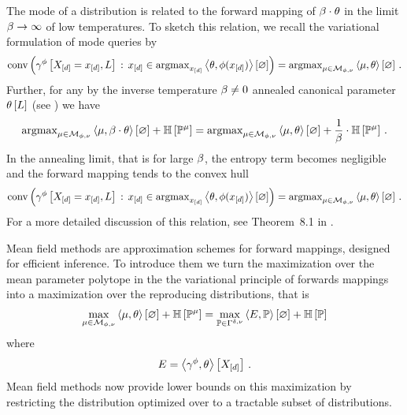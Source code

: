 The mode of a distribution is related to the forward mapping of $\beta\cdot\theta$ in the limit $\beta\rightarrow\infty$ of low temperatures.
To sketch this relation, we recall the variational formulation of mode queries by
\begin{align*}
    \mathrm{conv}\left(\gamma^{\phi}\left[X_{[d]}=x_{[d]},L\right] \, : \, x_{[d]}\in\mathrm{argmax}_{x_{[d]}}\left\langle \theta,\phi(x_{[d]})\right\rangle \left[ \varnothing \right]\right)
    = \mathrm{argmax}_{\mu\in\mathcal{M}_{\phi,\nu}} \left\langle \mu,\theta\right\rangle \left[ \varnothing \right]  \, .
\end{align*}
Further, for any by the inverse temperature $\beta\neq0$ annealed canonical parameter $\theta\left[L\right]$ (see ) we have
\begin{align*}
    \mathrm{argmax}_{\mu\in\mathcal{M}_{\phi,\nu}}  \left\langle \mu,\beta\cdot\theta\right\rangle \left[ \varnothing \right]+ \mathbb{H}\left[\mathbb{P}^{\mu}\right]
    = \mathrm{argmax}_{\mu\in\mathcal{M}_{\phi,\nu}}  \left\langle \mu,\theta\right\rangle \left[ \varnothing \right] + \frac{1}{\beta} \cdot \mathbb{H}\left[\mathbb{P}^{\mu}\right] \, .
\end{align*}
In the annealing limit, that is for large $\beta$, the entropy term becomes negligible and the forward mapping tends to the convex hull
\begin{align*}
    \mathrm{conv}\left(\gamma^{\phi}\left[X_{[d]}=x_{[d]},L\right] \, : \, x_{[d]}\in\mathrm{argmax}_{x_{[d]}}\left\langle \theta,\phi(x_{[d]})\right\rangle \left[ \varnothing \right]\right)
    = \mathrm{argmax}_{\mu\in\mathcal{M}_{\phi,\nu}} \left\langle \mu,\theta\right\rangle \left[ \varnothing \right]  \, .
\end{align*}
For a more detailed discussion of this relation, see Theorem~8.1 in \cite{wainwright_graphical_2008}.




Mean field methods are approximation schemes for forward mappings, designed for efficient inference.
To introduce them we turn the maximization over the mean parameter polytope in the the variational principle of forwards mappings into a maximization over the reproducing distributions, that is
\begin{align*}
    \max_{\mu\in\mathcal{M}_{\phi,\nu}}  \left\langle \mu,\theta\right\rangle \left[ \varnothing \right] + \mathbb{H}\left[\mathbb{P}^{\mu}\right]
    =
    \max_{\mathbb{P}\in\Gamma^{\delta,\nu}} \left\langle E,\mathbb{P}\right\rangle \left[ \varnothing \right] + \mathbb{H}\left[\mathbb{P}\right]
\end{align*}
where
\begin{align*}
    E = \left\langle \gamma^{\phi},\theta\right\rangle \left[ X_{[d]} \right] \, .
\end{align*}
Mean field methods now provide lower bounds on this maximization by restricting the distribution optimized over to a tractable subset of distributions.

